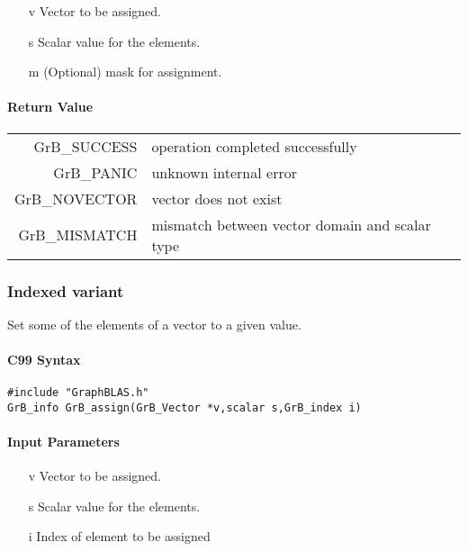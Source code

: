 \documentclass[11pt]{extarticle}
\begin{document}
\begin{itemize}
	\item[{\sf v}] Vector to be assigned.
	\item[{\sf s}] Scalar value for the elements.
	\item[{\sf m}] (Optional) mask for assignment. 
\end{itemize}

\paragraph{Return Value}

\begin{tabular}{rl}
{\sf GrB\_SUCCESS}	& operation completed successfully \\
{\sf GrB\_PANIC}	& unknown internal error \\
{\sf GrB\_NOVECTOR}	& vector does not exist \\
{\sf GrB\_MISMATCH}	& mismatch between vector domain and scalar type \\
\end{tabular}

\subsubsection{Indexed variant}

Set some of the elements of a vector to a given value.

\paragraph{C99 Syntax}

\begin{verbatim}
#include "GraphBLAS.h"
GrB_info GrB_assign(GrB_Vector *v,scalar s,GrB_index i)
\end{verbatim}

\paragraph{Input Parameters}

\begin{itemize}
	\item[{\sf v}] Vector to be assigned.
	\item[{\sf s}] Scalar value for the elements.
	\item[{\sf i}] Index of element to be assigned
\end{itemize}
\end{document}
